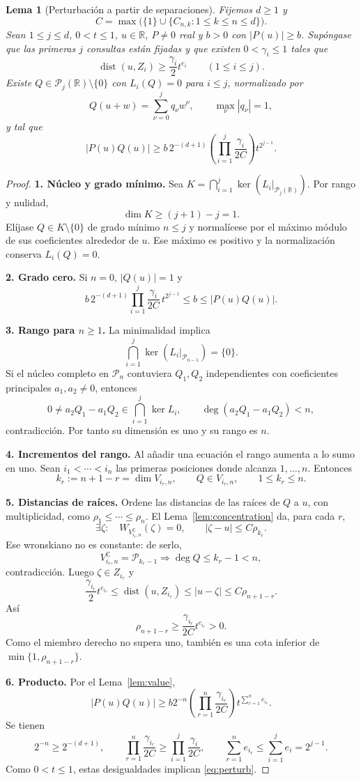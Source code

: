 \documentclass[11pt,a4paper]{article}
\numberwithin{equation}{section}
\newtheorem{lemma}[theorem]{Lema}
\theoremstyle{definition}
\theoremstyle{remark}
\newcommand{\R}{\mathbb R}
\newcommand{\C}{\mathbb C}
\newcommand{\PP}{\mathcal P}
\DeclareMathOperator{\dist}{dist}
\newcommand{\paso}[1]{\par\smallskip\noindent\textbf{#1}\quad}
\begin{document}
\begin{lemma}[Perturbación a partir de separaciones]\label{lem:perturb}
Fijemos $d\ge1$ y
\[
C=\max\bigl(\{1\}\cup\{C_{n,k}:1\le k\le n\le d\}\bigr).
\]
Sean $1\le j\le d$, $0<t\le1$, $u\in\R$, $P\ne0$ real y $b>0$ con $|P(u)|\ge b$. Supóngase que las primeras $j$ consultas están fijadas y que existen $0<\gamma_i\le1$ tales que
\begin{equation}\label{eq:separations}
\dist(u,Z_i)\ge\frac{\gamma_i}{2}t^{e_i}\qquad(1\le i\le j).
\end{equation}
Existe $Q\in\PP_j(\R)\setminus\{0\}$ con $L_i(Q)=0$ para $i\le j$, normalizado por
\[
Q(u+w)=\sum_{\nu=0}^jq_\nu w^\nu,\qquad\max_\nu|q_\nu|=1,
\]
y tal que
\begin{equation}\label{eq:perturb}
|P(u)Q(u)|\ge
b\,2^{-(d+1)}\left(\prod_{i=1}^j\frac{\gamma_i}{2C}\right)t^{2^{j-1}}.
\end{equation}
\end{lemma}
\begin{proof}
\paso{1. Núcleo y grado mínimo.}
Sea $K=\bigcap_{i=1}^j\ker(L_i|_{\PP_j(\R)})$. Por rango y nulidad,
\[
\dim K\ge(j+1)-j=1.
\]
Elíjase $Q\in K\setminus\{0\}$ de grado mínimo $n\le j$ y normalícese por el máximo módulo de sus coeficientes alrededor de $u$. Ese máximo es positivo y la normalización conserva $L_i(Q)=0$.
\paso{2. Grado cero.}
Si $n=0$, $|Q(u)|=1$ y
\[
b\,2^{-(d+1)}\prod_{i=1}^j\frac{\gamma_i}{2C}\,t^{2^{j-1}}
\le b\le|P(u)Q(u)|.
\]
\paso{3. Rango para $n\ge1$.}
La minimalidad implica
\[
\bigcap_{i=1}^j\ker(L_i|_{\PP_{n-1}})=\{0\}.
\]
Si el núcleo completo en $\PP_n$ contuviera $Q_1,Q_2$ independientes con coeficientes principales $a_1,a_2\ne0$, entonces
\[
0\ne a_2Q_1-a_1Q_2\in\bigcap_{i=1}^j\ker L_i,
\qquad\deg(a_2Q_1-a_1Q_2)<n,
\]
contradicción. Por tanto su dimensión es uno y su rango es $n$.
\paso{4. Incrementos del rango.}
Al añadir una ecuación el rango aumenta a lo sumo en uno. Sean $i_1<\cdots<i_n$ las primeras posiciones donde alcanza $1,\ldots,n$. Entonces
\[
k_r:=n+1-r=\dim V_{i_r,n},\qquad Q\in V_{i_r,n},\qquad1\le k_r\le n.
\]
\paso{5. Distancias de raíces.}
Ordene las distancias de las raíces de $Q$ a $u$, con multiplicidad, como $\rho_1\le\cdots\le\rho_n$. El Lema~\ref{lem:concentration} da, para cada $r$,
\[
\exists\zeta:\quad W_{V_{i_r,n}^{\C}}(\zeta)=0,
\qquad |\zeta-u|\le C\rho_{k_r}.
\]
Ese wronskiano no es constante: de serlo,
\[
V_{i_r,n}^{\C}=\PP_{k_r-1}\Longrightarrow\deg Q\le k_r-1<n,
\]
contradicción. Luego $\zeta\in Z_{i_r}$ y
\[
\frac{\gamma_{i_r}}2t^{e_{i_r}}
\le\dist(u,Z_{i_r})\le|u-\zeta|\le C\rho_{n+1-r}.
\]
Así
\begin{equation}\label{eq:rootdist}
\rho_{n+1-r}\ge\frac{\gamma_{i_r}}{2C}t^{e_{i_r}}>0.
\end{equation}
Como el miembro derecho no supera uno, también es una cota inferior de $\min\{1,\rho_{n+1-r}\}$.
\paso{6. Producto.}
Por el Lema~\ref{lem:value},
\[
|P(u)Q(u)|\ge b2^{-n}\left(\prod_{r=1}^n\frac{\gamma_{i_r}}{2C}\right)
t^{\sum_{r=1}^ne_{i_r}}.
\]
Se tienen
\[
2^{-n}\ge2^{-(d+1)},\qquad
\prod_{r=1}^n\frac{\gamma_{i_r}}{2C}\ge\prod_{i=1}^j\frac{\gamma_i}{2C},
\qquad
\sum_{r=1}^ne_{i_r}\le\sum_{i=1}^je_i=2^{j-1}.
\]
Como $0<t\le1$, estas desigualdades implican \eqref{eq:perturb}.
\end{proof}
\end{document}
